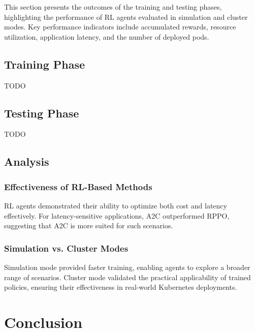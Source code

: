 \documentclass[conference]{IEEEtran}
\begin{document}
This section presents the outcomes of the training and testing phases, highlighting the performance of RL agents evaluated in simulation and cluster modes. Key performance indicators include accumulated rewards, resource utilization, application latency, and the number of deployed pods.

\subsection{Training Phase}
TODO

\subsection{Testing Phase}
TODO

\subsection{Analysis}

\subsubsection{Effectiveness of RL-Based Methods}
RL agents demonstrated their ability to optimize both cost and latency effectively. For latency-sensitive applications, A2C outperformed RPPO, suggesting that A2C is more suited for such scenarios.

\subsubsection{Simulation vs. Cluster Modes}
Simulation mode provided faster training, enabling agents to explore a broader range of scenarios. Cluster mode validated the practical applicability of trained policies, ensuring their effectiveness in real-world Kubernetes deployments.


\section{Conclusion}
\label{sec:conclusion}
\end{document}
